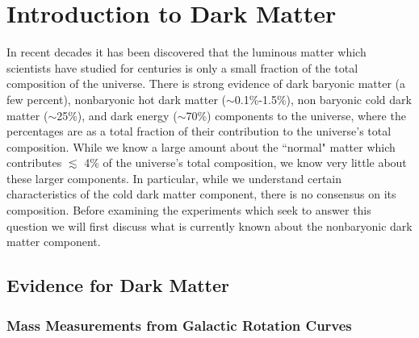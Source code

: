\documentclass[a4paper,12pt]{article}
\begin{document}









\newcommand{\overbar}[1]{\mkern 1.5mu\overline{\mkern-1.5mu#1\mkern-1.5mu}\mkern 1.5mu}

\begingroup
\singlespacing
\tableofcontents
\listoftables
\listoffigures
\endgroup


\section{Introduction to Dark Matter}



In recent decades it has been discovered that the luminous matter which scientists have studied for centuries is only a small fraction of the total composition of the universe.  There is strong evidence of dark baryonic matter (a few percent), nonbaryonic hot dark matter ($\sim$0.1\%-1.5\%), non baryonic cold dark matter ($\sim$25\%), and dark energy ($\sim$70\%) components to the universe, where the percentages are as a total fraction of their contribution to the universe's total composition.  While we know a large amount about the ``normal" matter which contributes $ \lesssim $ 4\% of the universe's total composition, we know very little about these larger components.  In particular, while we understand certain characteristics of the cold dark matter component, there is no consensus on its composition.  Before examining the experiments which seek to answer this question we will first discuss what is currently known about the nonbaryonic dark matter component.

\subsection{Evidence for Dark Matter}

\subsubsection{Mass Measurements from Galactic Rotation Curves}
\end{document}
